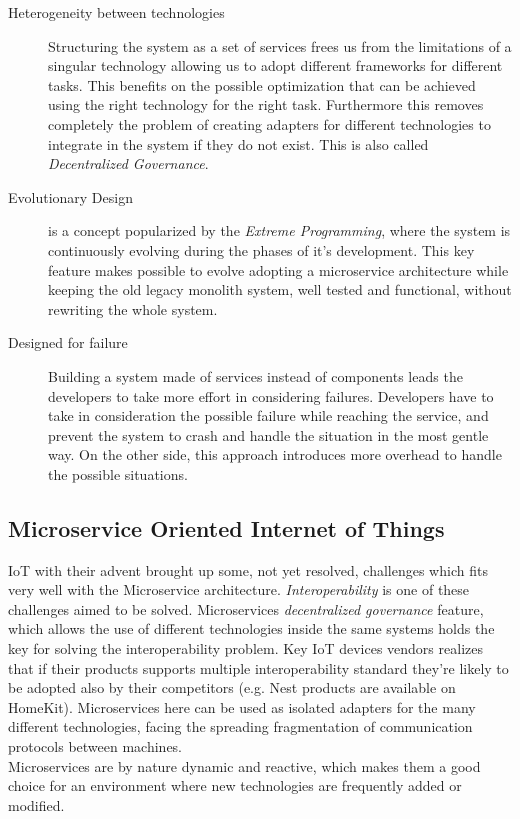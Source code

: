 \begin{description}
  \item[Heterogeneity between technologies] Structuring the system as a set
  of services frees us from the limitations of a singular technology allowing
  us to adopt different frameworks for different tasks. This benefits on the
  possible optimization that can be achieved using the right technology for the
  right task. Furthermore this removes completely the problem of creating adapters
  for different technologies to integrate in the system if they do not exist. This is
  also called \textit{Decentralized Governance}.
  \item[Evolutionary Design] is a concept popularized by the \textit{Extreme Programming},
  where the system is continuously evolving during the phases of it's development.
  This key feature makes possible to evolve adopting a microservice architecture while
  keeping the old legacy monolith system, well tested and functional, without rewriting
  the whole system.
  \item[Designed for failure] Building a system made of services instead of components
  leads the developers to take more effort in considering failures. Developers have
  to take in consideration the possible failure while reaching the service, and
  prevent the system to crash and handle the situation in the most gentle way. On the
  other side, this approach introduces more overhead to handle the possible situations.


\end{description}


\subsection{Microservice Oriented Internet of Things}
\label{ref:microappr}
IoT with their advent brought up some, not yet resolved, challenges which fits
very well with the Microservice architecture. \textit{Interoperability} is one of these
challenges aimed to be solved. Microservices \textit{decentralized governance} feature,
which allows the use of different technologies inside the same systems holds the key for
solving the interoperability problem. Key IoT devices vendors realizes that if their products
supports multiple interoperability standard they're likely to be adopted also by their
competitors (e.g. Nest products are available on HomeKit). Microservices here can be
used as isolated adapters for the many different technologies, facing the spreading
fragmentation of communication protocols between machines.\\
Microservices are by nature dynamic and reactive, which makes them a good choice for
an environment where new technologies are frequently added or modified.

